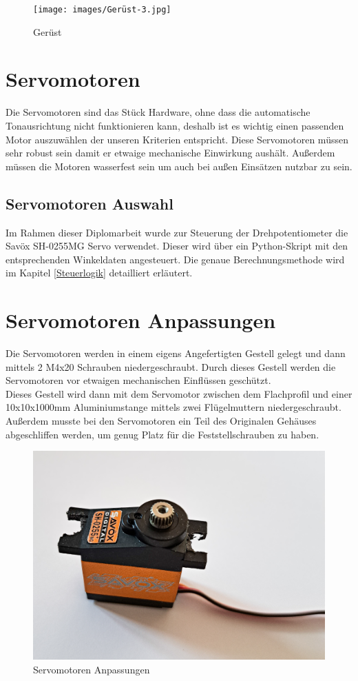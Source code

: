 \begin{figure}[H]
	\centering
	\texttt{[image: images/Gerüst-3.jpg]}
	\caption[Gerüst]{Gerüst}
	\label{fig:Gerüst-2}
\end{figure}


\section{Servomotoren}
Die Servomotoren sind das Stück Hardware, ohne dass die automatische Tonausrichtung nicht funktionieren kann, deshalb ist es wichtig einen passenden Motor auszuwählen der unseren Kriterien entspricht. Diese Servomotoren müssen sehr robust sein damit er etwaige mechanische Einwirkung aushält. Außerdem müssen die Motoren wasserfest sein um auch bei außen Einsätzen nutzbar zu sein. 

\subsection{Servomotoren Auswahl}

Im Rahmen dieser Diplomarbeit wurde zur Steuerung der Drehpotentiometer die Savöx SH-0255MG Servo verwendet. Dieser wird über ein Python-Skript mit den entsprechenden Winkeldaten angesteuert. Die genaue Berechnungsmethode wird im Kapitel \ref{Steuerlogik} detailliert erläutert.

\section{Servomotoren Anpassungen}
Die Servomotoren werden in einem eigens Angefertigten Gestell gelegt und dann mittels 2 M4x20 Schrauben niedergeschraubt. Durch dieses Gestell werden die Servomotoren vor etwaigen mechanischen Einflüssen geschützt. \\
Dieses Gestell wird dann mit dem Servomotor zwischen dem Flachprofil und einer 10x10x1000mm Aluminiumstange mittels zwei Flügelmuttern niedergeschraubt.\\
Außerdem musste bei den Servomotoren ein Teil des Originalen Gehäuses abgeschliffen werden, um genug Platz für die Feststellschrauben zu haben.

\begin{figure}[H]
	\centering
	\includegraphics[width=0.4\linewidth]{images/Servo-Anpassungen.jpg}
	\caption[Servomotoren Anpassungen]{Servomotoren Anpassungen}
	\label{fig:Servomotoren Anpassungen}
\end{figure}


